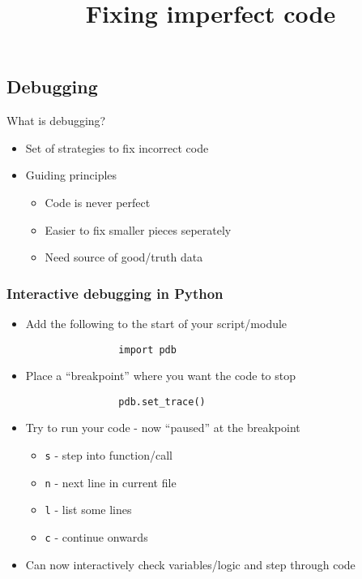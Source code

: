 \documentclass[11pt,professionalfonts]{beamer}
\title[Debugging]{\large \textbf{Fixing imperfect code}}
\author{\vspace*{-0.3cm}}
\institute{
  \footnotesize
  {\normalsize\bf{Shankar Kulumani}}\\
  \vspace*{0.2cm}
    \textbf{Flight Dynamics \& Control Lab}\\ \vspace*{0.5cm}
  \begin{figure} %
        \texttt{[image: figures/gw\_txh\_2cs\_pos.pdf]}
    \end{figure}
}
\date{}
\begin{document}

\setcounter{framenumber}{-1}
\begin{frame} %
  \titlepage
\end{frame}   %

\section*{}
\subsection*{Debugging}  
\begin{frame}{What is debugging?}
    \begin{itemize}
        \item Set of strategies to fix incorrect code
        \item Guiding principles
            \begin{itemize}
                \item Code is never perfect
                \item Easier to fix smaller pieces seperately
                \item Need source of good/truth data
            \end{itemize}
    \end{itemize}
\end{frame}

\begin{frame}[fragile]\frametitle{Interactive debugging in Python}
    \begin{itemize}
        \item Add the following to the start of your script/module
            \begin{verbatim}
                import pdb
            \end{verbatim}
        \item Place a ``breakpoint'' where you want the code to stop
            \begin{verbatim}
                pdb.set_trace()
            \end{verbatim}
        \item Try to run your code - now ``paused'' at the breakpoint
            \begin{itemize}
                \item \texttt{s} - step into function/call
                \item \texttt{n} - next line in current file
                \item \texttt{l} - list some lines
                \item \texttt{c} - continue onwards
            \end{itemize}
        \item Can now interactively check variables/logic and step through code
    \end{itemize}
\end{frame}
\end{document}
